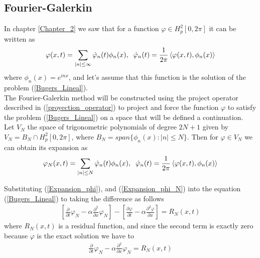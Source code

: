\subsection{Fourier-Galerkin}
    \label{Galerkin}
	\vspace{0.3cm} 
	
	
	In chapter \ref{Chapter_2} we saw that for a function $\varphi \in H^2_p [0, 2 \pi]$ it can be written as
	\begin{align}
	\label{Expansion_phi}	
		\varphi (x, t) = \displaystyle \sum_{|n| \leq \infty} \hat{\varphi}_n (t) \phi_n (x), \hspace{2mm} \hat{\varphi}_n (t) = \frac{1}{2 \pi} \left\langle \varphi (x, t), \phi_n (x) \right\rangle  
	\end{align}
	where $\phi_n (x) = e^{inx}$, and let's assume that this function is the solution of the problem (\ref{Bugers_Lineal}).\\
	
	The Fourier-Galerkin method will be constructed using the project operator described in (\ref{proyection_operator}) to project and force the function $\varphi$ to satisfy the problem (\ref{Bugers_Lineal}) on a space that will be defined a continuation. \\
	
	Let $V_N$ the space of trigonometric polynomials of degree $2N + 1$ given by $V_N = B_N \cap H^2_p [0, 2 \pi]$, where $B_N = span\{\phi_n (x) : |n| \leq N\}$. Then for $\varphi \in V_N$ we can obtain its expansion as  
	\begin{align}
	\label{Expansion_phi_N}	
		\varphi_N (x, t) = \displaystyle \sum_{|n| \leq N} \hat{\varphi}_n (t) \phi_n (x), \hspace{2mm} \hat{\varphi}_n (t) = \frac{1}{2 \pi} \left\langle \varphi (x, t), \phi_n (x) \right\rangle  
	\end{align} 
	
	Substituting (\ref{Expansion_phi}), and (\ref{Expansion_phi_N}) into the equation (\ref{Bugers_Lineal}) to taking the difference as follows
	\begin{align*}
		\left[ \frac{\partial}{\partial t} \varphi_N - \alpha \frac{\partial^2}{\partial x} \varphi_N \right] - \left[ \frac{\partial \varphi}{\partial t} - \alpha \frac{\partial^2 \varphi}{\partial x} \right] = R_N (x, t)   
	\end{align*}
	where $R_N (x, t)$ is a residual function, and since the second term is exactly zero because $\varphi$ is the exact solution we have to
	\begin{align*}
		\frac{\partial}{\partial t} \varphi_N -  \alpha \frac{\partial^2}{\partial x} \varphi_N = R_N (x, t)
	\end{align*}
	
